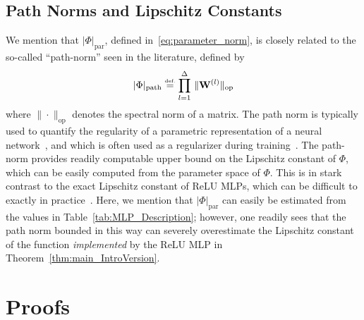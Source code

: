 \documentclass{article}
\numberwithin{equation}{section}
\theoremstyle{definition}
\newcommand{\eqdef}{\ensuremath{\stackrel{\mbox{\upshape\tiny def.}}{=}}}
\begin{document}
\subsection{Path Norms and Lipschitz Constants}
 We mention that $|\Phi|_{\operatorname{par}}$, defined in~\eqref{eq:parameter_norm}, is closely related to the so-called ``path-norm'' seen in the literature, defined by
\begin{equation*}
    |\Phi|_{\operatorname{path}} \eqdef \prod_{l=1}^{\Delta}\,\|\mathbf{W}^{(l)}\|_{\operatorname{op}}
\end{equation*}
where $\|\cdot\|_{\operatorname{op}}$ denotes the spectral norm of a matrix.  The path norm is typically used to quantify the regularity of a parametric representation of a neural network~\cite{NeyshaburetALPathnorm_NIPS2017}, and which is often used as a regularizer during training~\cite{neyshabur2015pathSGD_NIPS}.  The path-norm provides readily computable upper bound on the Lipschitz constant of $\Phi$, which can be easily computed from the parameter space of $\Phi$.  This is in stark contrast to the exact Lipschitz constant of ReLU MLPs, which can be difficult to exactly in practice~\cite{virmaux2018lipschitz}.  Here, we mention that $|\Phi|_{\operatorname{par}}$ can easily be estimated from the values in Table~\ref{tab:MLP_Description}; however, one readily sees that the path norm bounded in this way can severely overestimate the Lipschitz constant of the function \textit{implemented} by the ReLU MLP in Theorem~\ref{thm:main_IntroVersion}.



\section{Proofs}
\label{s:Proofs}
\end{document}

